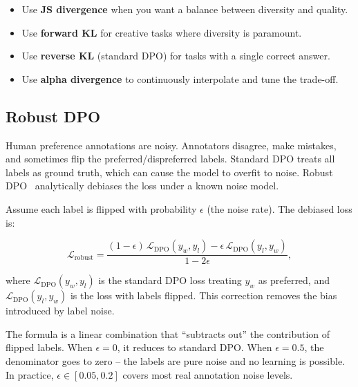 \begin{keybox}
\begin{itemize}
  \item Use \textbf{JS divergence} when you want a balance between diversity and quality.
  \item Use \textbf{forward KL} for creative tasks where diversity is paramount.
  \item Use \textbf{reverse KL} (standard DPO) for tasks with a single correct answer.
  \item Use \textbf{alpha divergence} to continuously interpolate and tune the trade-off.
\end{itemize}
\end{keybox}

\subsection{Robust DPO}
\label{sec:robust-dpo}

\begin{intuitionbox}
Human preference annotations are noisy. Annotators disagree, make mistakes, and sometimes flip the preferred/dispreferred labels. Standard DPO treats all labels as ground truth, which can cause the model to overfit to noise. Robust DPO~\cite{chowdhury2024robustdpo} analytically debiases the loss under a known noise model.
\end{intuitionbox}

Assume each label is flipped with probability $\epsilon$ (the noise rate). The debiased loss is:

\[
\boxed{
    \mathcal{L}_{\text{robust}} =
    \frac{(1-\epsilon)\,\mathcal{L}_{\text{DPO}}(y_w, y_l)
          - \epsilon\,\mathcal{L}_{\text{DPO}}(y_l, y_w)}{1 - 2\epsilon},
  }
\]

where $\mathcal{L}_{\text{DPO}}(y_w, y_l)$ is the standard DPO loss treating $y_w$ as preferred, and $\mathcal{L}_{\text{DPO}}(y_l, y_w)$ is the loss with labels flipped. This correction removes the bias introduced by label noise.

\begin{keybox}
The formula is a linear combination that ``subtracts out'' the contribution of flipped labels. When $\epsilon=0$, it reduces to standard DPO. When $\epsilon=0.5$, the denominator goes to zero -- the labels are pure noise and no learning is possible. In practice, $\epsilon \in [0.05, 0.2]$ covers most real annotation noise levels.
\end{keybox}

